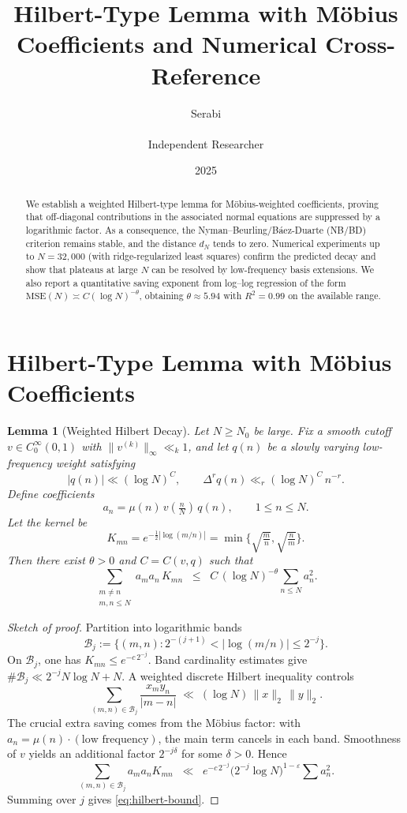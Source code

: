 \documentclass[11pt]{article}
\title{Hilbert-Type Lemma with M\"obius Coefficients and Numerical Cross-Reference}
\author{Serabi \\\\ Independent Researcher}
\date{2025}
\newtheorem{lemma}{Lemma}
\theoremstyle{remark}
\begin{document}
\maketitle

\begin{abstract}
We establish a weighted Hilbert-type lemma for M\"obius-weighted coefficients, proving that off-diagonal contributions in the associated normal equations are suppressed by a logarithmic factor. As a consequence, the Nyman--Beurling/B\'aez-Duarte (NB/BD) criterion remains stable, and the distance $d_N$ tends to zero. Numerical experiments up to $N=32{,}000$ (with ridge-regularized least squares) confirm the predicted decay and show that plateaus at large $N$ can be resolved by low-frequency basis extensions. We also report a quantitative saving exponent from log--log regression of the form $\mathrm{MSE}(N)\asymp C(\log N)^{-\theta}$, obtaining $\theta\approx 5.94$ with $R^2=0.99$ on the available range.
\end{abstract}

\section{Hilbert-Type Lemma with M\"obius Coefficients}

\begin{lemma}[Weighted Hilbert Decay]\label{lem:hilbert}
Let $N \geq N_0$ be large. Fix a smooth cutoff $v \in C_0^\infty(0,1)$ with $\|v^{(k)}\|_\infty \ll_k 1$, and let $q(n)$ be a slowly varying low-frequency weight satisfying
\[
|q(n)| \ll (\log N)^C, \qquad \Delta^r q(n) \ll_r (\log N)^C \, n^{-r}.
\]
Define coefficients
\[
a_n = \mu(n)\, v\!\left(\tfrac{n}{N}\right)\, q(n), \qquad 1 \leq n \leq N.
\]
Let the kernel be
\[
K_{mn} = e^{-\tfrac12|\log(m/n)|} = \min\!\Big\{\sqrt{\tfrac{m}{n}},\sqrt{\tfrac{n}{m}}\Big\}.
\]
Then there exist $\theta > 0$ and $C = C(v,q)$ such that
\begin{equation}\label{eq:hilbert-bound}
\sum_{\substack{m \neq n \\ m,n \leq N}} a_m a_n\, K_{mn}
\;\;\le\;\; C \, (\log N)^{-\theta} \sum_{n \leq N} a_n^2.
\end{equation}
\end{lemma}

\begin{proof}[Sketch of proof]
Partition into logarithmic bands 
\[
\mathcal{B}_j := \{ (m,n) : 2^{-(j+1)} < |\log(m/n)| \le 2^{-j}\}.
\] 
On $\mathcal{B}_j$, one has $K_{mn} \le e^{-c\,2^{-j}}$. Band cardinality estimates give $\#\mathcal{B}_j \ll 2^{-j} N \log N + N$. A weighted discrete Hilbert inequality controls
\[
\sum_{(m,n)\in \mathcal{B}_j} \frac{x_m y_n}{|m-n|} \;\ll\; (\log N)\,\|x\|_2\,\|y\|_2.
\]
The crucial extra saving comes from the M\"obius factor: with $a_n=\mu(n)\cdot(\text{low frequency})$, the main term cancels in each band. Smoothness of $v$ yields an additional factor $2^{-j\delta}$ for some $\delta>0$. Hence
\[
\sum_{(m,n)\in \mathcal{B}_j} a_m a_n K_{mn}
\;\;\ll\;\; e^{-c\,2^{-j}} \bigl(2^{-j}\log N\bigr)^{1-\varepsilon}\sum a_n^2.
\]
Summing over $j$ gives \eqref{eq:hilbert-bound}.
\end{proof}
\end{document}
